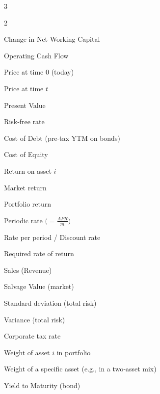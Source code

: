 \documentclass[10pt,landscape,fleqn]{article}
\begin{document}
\begin{multicols*}{3}
\begin{multicols}{2}
\begin{description}[leftmargin=1.4cm,labelwidth=1.2cm,itemsep=0.5pt]
  \item[$\Delta NWC$] Change in Net Working Capital
  \item[$OCF$] Operating Cash Flow
  \item[$P_0$] Price at time 0 (today)
  \item[$P_t$] Price at time \(t\)
  \item[$PV$] Present Value
  \item[$R_f$] Risk‐free rate
  \item[$R_d$] Cost of Debt (pre‐tax YTM on bonds) 
  \item[$R_e$] Cost of Equity 
  \item[$R_i$] Return on asset \(i\)
  \item[$R_m$] Market return
  \item[$R_p$] Portfolio return
  \item[$R_{\mathrm{per}}$] Periodic rate \(\bigl(=\frac{APR}{m}\bigr)\)
  \item[$r$] Rate per period / Discount rate
  \item[$r_{\mathrm{req}}$] Required rate of return
  \item[$S$] Sales (Revenue)
  \item[$SV$] Salvage Value (market)
  \item[$\sigma$] Standard deviation (total risk)
  \item[$\sigma^2$] Variance (total risk)
  \item[$T_c$] Corporate tax rate
  \item[$w_i$] Weight of asset \(i\) in portfolio
  \item[$x$] Weight of a specific asset (e.g., in a two‐asset mix) 
  \item[$YTM$] Yield to Maturity (bond)
\end{description}
\end{multicols}

\end{multicols*}
\end{document}
